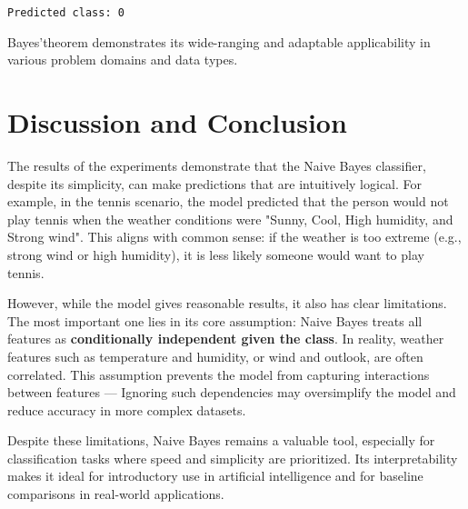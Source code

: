 \documentclass{article}
\begin{document}
\begin{lstlisting}
Predicted class: 0 
\end{lstlisting}


Bayes'theorem demonstrates its wide-ranging and adaptable applicability in various problem domains and data types.


\section*{Discussion and Conclusion}

The results of the experiments demonstrate that the Naive Bayes classifier, despite its simplicity, 
can make predictions that are intuitively logical. For example, in the tennis scenario, 
the model predicted that the person would not play tennis when the weather conditions were "Sunny, Cool, High humidity, and Strong wind". 
This aligns with common sense: if the weather is too extreme (e.g., strong wind or high humidity),
 it is less likely someone would want to play tennis.

However, while the model gives reasonable results, it also has clear limitations. 
The most important one lies in its core assumption: Naive Bayes treats all features as \textbf{conditionally independent given the class}. 
In reality, weather features such as temperature and humidity, or wind and outlook, are often correlated. 
This assumption prevents the model from capturing interactions between features — 
Ignoring such dependencies may oversimplify the model and reduce accuracy in more complex datasets.

Despite these limitations, Naive Bayes remains a valuable tool, especially for classification tasks where speed and simplicity are prioritized. 
Its interpretability makes it ideal for introductory use in artificial intelligence and for baseline comparisons in real-world applications.
\end{document}
